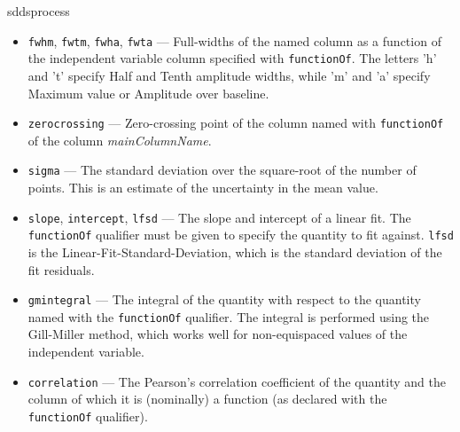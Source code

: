 \begin{sddsprog}{sddsprocess}
\begin{itemize}
\begin{itemize}
\begin{itemize}
\item {\tt fwhm}, {\tt fwtm}, {\tt fwha}, {\tt fwta} --- Full-widths of the named column as a function
of the independent variable column specified with {\tt functionOf}.  The letters 'h' and 't' specify Half and Tenth
amplitude widths, while 'm' and 'a' specify Maximum value or Amplitude over baseline.

\item {\tt zerocrossing} --- Zero-crossing point of the column named with {\tt functionOf} of the
column {\em mainColumnName}.

\item {\tt sigma} --- The standard deviation over the square-root of the number of points.  This is an
estimate of the uncertainty in the mean value.

\item {\tt slope}, {\tt intercept}, {\tt lfsd} --- The slope and intercept of a linear fit.  The {\tt functionOf}
qualifier must be given to specify the quantity to fit against.  {\tt lfsd} is the Linear-Fit-Standard-Deviation,
which is the standard deviation of the fit residuals.

\item {\tt gmintegral} --- The integral of the quantity with respect to the quantity named with the {\tt functionOf} qualifier.
  The integral is performed using the Gill-Miller method, which works well for non-equispaced values of the independent
  variable.

\item {\tt correlation} --- The Pearson's correlation coefficient of the quantity and the column of which it is 
  (nominally) a function (as declared with the {\tt functionOf} qualifier).

\end{itemize}


\end{itemize}
\end{itemize}
\end{sddsprog}
